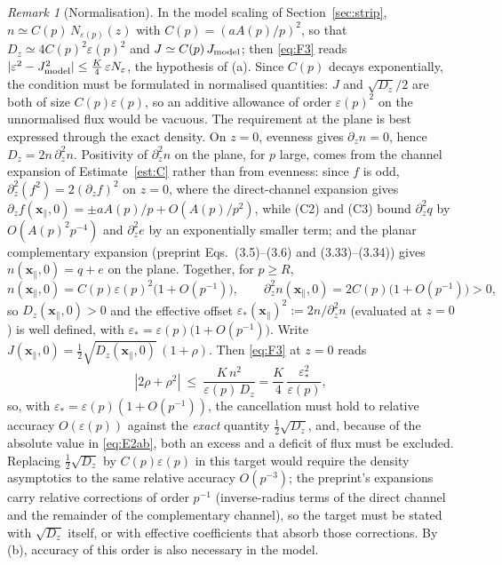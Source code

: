 \documentclass[11pt,a4paper]{article}
\theoremstyle{plain}
\theoremstyle{definition}
\theoremstyle{remark}
\newtheorem{remark}[theorem]{Remark}
\begin{document}
\begin{remark}[Normalisation]\label{rem:norm}
In the model scaling of Section~\ref{sec:strip}, $n\simeq C(p)\,N_{\varepsilon(p)}(z)$ with $C(p)=(aA(p)/p)^2$, so that $D_z\simeq4C(p)^2\varepsilon(p)^2$ and $J\simeq C(p)\,J_{\rm model}$; then \eqref{eq:F3} reads $|\varepsilon^2-J_{\rm model}^2|\le\tfrac K4\,\varepsilon N_\varepsilon$, the hypothesis of (a). Since $C(p)$ decays exponentially, the condition must be formulated in normalised quantities: $J$ and $\sqrt{D_z}/2$ are both of size $C(p)\varepsilon(p)$, so an additive allowance of order $\varepsilon(p)^2$ on the unnormalised flux would be vacuous. The requirement at the plane is best expressed through the exact density. On $z=0$, evenness gives $\partial_zn=0$, hence $D_z=2n\,\partial_z^2n$. Positivity of $\partial_z^2n$ on the plane, for $p$ large, comes from the channel expansion of Estimate~\ref{est:C} rather than from evenness: since $f$ is odd, $\partial_z^2(f^2)=2(\partial_zf)^2$ on $z=0$, where the direct-channel expansion gives $\partial_zf(\mathbf x_\parallel,0)=\pm aA(p)/p+O(A(p)/p^2)$, while (C2) and (C3) bound $\partial_z^2q$ by $O(A(p)^2p^{-4})$ and $\partial_z^2e$ by an exponentially smaller term; and the planar complementary expansion (preprint Eqs.~(3.5)--(3.6) and (3.33)--(3.34)) gives $n(\mathbf x_\parallel,0)=q+e$ on the plane. Together, for $p\ge R$,
\[
n(\mathbf x_\parallel,0)=C(p)\varepsilon(p)^2\big(1+O(p^{-1})\big),\qquad
\partial_z^2n(\mathbf x_\parallel,0)=2C(p)\big(1+O(p^{-1})\big)>0 ,
\]
so $D_z(\mathbf x_\parallel,0)>0$ and the effective offset $\varepsilon_*(\mathbf x_\parallel)^2:=2n/\partial_z^2n$ (evaluated at $z=0$) is well defined, with $\varepsilon_*=\varepsilon(p)\big(1+O(p^{-1})\big)$. Write $J(\mathbf x_\parallel,0)=\tfrac12\sqrt{D_z(\mathbf x_\parallel,0)}\,(1+\rho)$. Then \eqref{eq:F3} at $z=0$ reads
\[
|2\rho+\rho^2|\ \le\ \frac{K\,n^2}{\varepsilon(p)\,D_z}=\frac K4\,\frac{\varepsilon_*^2}{\varepsilon(p)} ,
\]
so, with $\varepsilon_*=\varepsilon(p)(1+O(p^{-1}))$, the cancellation must hold to relative accuracy $O(\varepsilon(p))$ against the \emph{exact} quantity $\tfrac12\sqrt{D_z}$, and, because of the absolute value in \eqref{eq:E2ab}, both an excess and a deficit of flux must be excluded. Replacing $\tfrac12\sqrt{D_z}$ by $C(p)\varepsilon(p)$ in this target would require the density asymptotics to the same relative accuracy $O(p^{-3})$; the preprint's expansions carry relative corrections of order $p^{-1}$ (inverse-radius terms of the direct channel and the remainder of the complementary channel), so the target must be stated with $\sqrt{D_z}$ itself, or with effective coefficients that absorb those corrections. By (b), accuracy of this order is also necessary in the model.
\end{remark}
\end{document}
